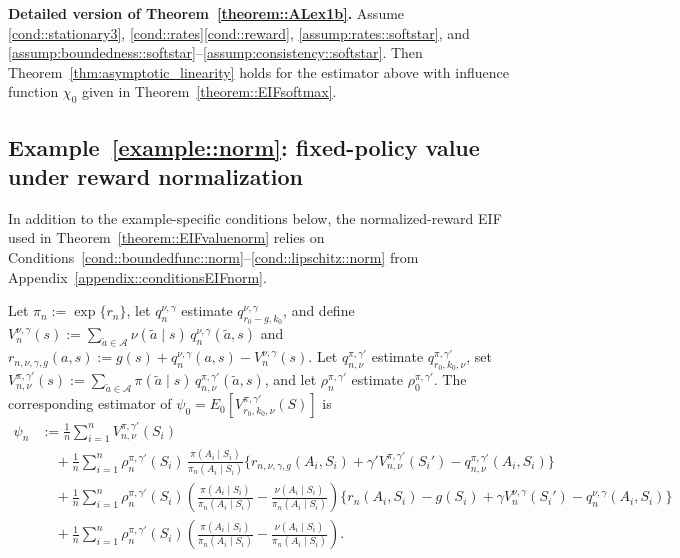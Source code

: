 \documentclass[11pt]{article}
\theoremstyle{plain}
\begin{document}
\medskip\noindent\textbf{Detailed version of Theorem~\ref{theorem::ALex1b}.}
Assume \ref{cond::stationary3}, \ref{cond::rates}\ref{cond::reward},
\ref{assump:rates::softstar}, and
\ref{assump:boundedness::softstar}--\ref{assump:consistency::softstar}. Then
Theorem~\ref{thm:asymptotic_linearity} holds for the estimator above with
influence function \(\chi_0\) given in Theorem~\ref{theorem::EIFsoftmax}.

\subsection{Example~\ref{example::norm}: fixed-policy value under reward normalization}

In addition to the example-specific conditions below, the normalized-reward EIF
used in Theorem~\ref{theorem::EIFvaluenorm} relies on
Conditions~\ref{cond::boundedfunc::norm}--\ref{cond::lipschitz::norm} from
Appendix~\ref{appendix::conditionsEIFnorm}.

Let \(\pi_n:=\exp\{r_n\}\), let \(q_n^{\nu,\gamma}\) estimate
\(q_{r_0-g,k_0}^{\nu,\gamma}\), and define
\(V_n^{\nu,\gamma}(s):=\sum_{\tilde a\in\mathcal A}\nu(\tilde a\mid s)\,
q_n^{\nu,\gamma}(\tilde a,s)\) and
\(r_{n,\nu,\gamma,g}(a,s):=g(s)+q_n^{\nu,\gamma}(a,s)-V_n^{\nu,\gamma}(s)\).
Let \(q_{n,\nu}^{\pi,\gamma'}\) estimate
\(q_{r_0,k_0,\nu}^{\pi,\gamma'}\), set
\(V_{n,\nu}^{\pi,\gamma'}(s):=\sum_{\tilde a\in\mathcal A}\pi(\tilde a\mid s)\,
q_{n,\nu}^{\pi,\gamma'}(\tilde a,s)\), and let \(\rho_n^{\pi,\gamma'}\)
estimate \(\rho_0^{\pi,\gamma'}\). The corresponding estimator of
\(\psi_0=E_0[V_{r_0,k_0,\nu}^{\pi,\gamma'}(S)]\) is
\begin{align*}
\psi_n
&:= \frac{1}{n}\sum_{i=1}^n V_{n,\nu}^{\pi,\gamma'}(S_i) \\
&\quad + \frac{1}{n}\sum_{i=1}^n \rho_n^{\pi,\gamma'}(S_i)\,
        \frac{\pi(A_i \mid S_i)}{\pi_n(A_i \mid S_i)}
        \bigl\{r_{n,\nu,\gamma,g}(A_i,S_i)
        + \gamma' V_{n,\nu}^{\pi,\gamma'}(S_i')
        - q_{n,\nu}^{\pi,\gamma'}(A_i,S_i)\bigr\} \\
&\quad + \frac{1}{n}\sum_{i=1}^n \rho_n^{\pi,\gamma'}(S_i)
        \left(
            \frac{\pi(A_i \mid S_i)}{\pi_n(A_i \mid S_i)}
            -
            \frac{\nu(A_i \mid S_i)}{\pi_n(A_i \mid S_i)}
        \right)
        \bigl\{r_n(A_i,S_i) - g(S_i)
        + \gamma V_n^{\nu,\gamma}(S_i')
        - q_n^{\nu,\gamma}(A_i,S_i)\bigr\} \\
&\quad + \frac{1}{n}\sum_{i=1}^n \rho_n^{\pi,\gamma'}(S_i)
        \left(
            \frac{\pi(A_i \mid S_i)}{\pi_n(A_i \mid S_i)}
            -
            \frac{\nu(A_i \mid S_i)}{\pi_n(A_i \mid S_i)}
        \right).
\end{align*}
\end{document}
